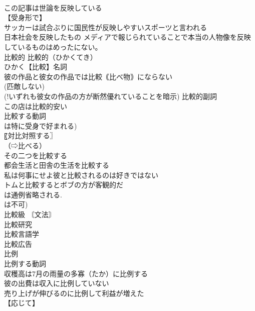 \documentclass[8pt]{extreport}
\begin{document}
\begin{CJK}{UTF8}{min}
\\	この記事は世論を反映している 
\\	【受身形で】
\\	サッカーは試合ぶりに国民性が反映しやすいスポーツと言われる 
\\	日本社会を反映したもの メディアで報じられていることで本当の人物像を反映しているものはめったにない。 
\\	比較的		比較的（ひかくてき） 
\\	ひかく【比較】名詞 
\\	彼の作品と彼女の作品では比較｟比べ物｠にならない 
\\	(匹敵しない) 
\\	(!いずれも彼女の作品の方が断然優れていることを暗示) 比較的副詞 
\\	この店は比較的安い 
\\	比較する動詞 
\\	は特に受身で好まれる) 
\\	〖対比対照する〗
\\	（⇨比べる） 
\\	その二つを比較する 
\\	都会生活と田舎の生活を比較する 
\\	私は何事にせよ彼と比較されるのは好きではない 
\\	トムと比較するとボブの方が客観的だ 
\\	は通例省略される. 
\\	は不可) 
\\	比較級 〘文法〙
\\	比較研究 
\\	比較言語学 
\\	比較広告 
\\	[｟話｠ 
\\	比較宗教学 
\\	比較文化 
\\	比較文学 
\\	かくさ【較差】 【変動幅】
\\	年間の気温較差 
\\	ひれい【比例】名詞 〖釣り合い〗
\\	〖比率〗
\\	（⇨比率） 
\\	正[反]比例 
\\	比例する動詞 
\\	収穫高は7月の雨量の多寡（たか）に比例する 
\\	彼の出費は収入に比例していない 
\\	売り上げが伸びるのに比例して利益が増えた 
\\	【応じて】

\end{CJK}
\end{document}
